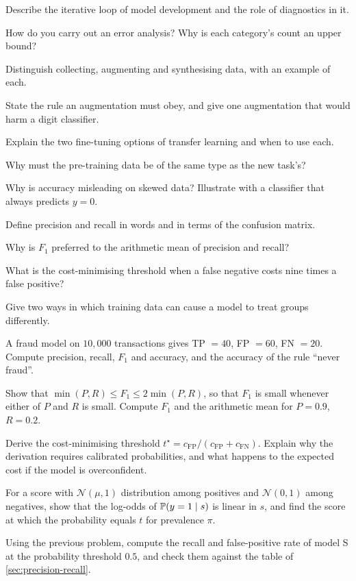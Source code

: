 
\sq Describe the iterative loop of model development and the role of
diagnostics in it.

\sq How do you carry out an error analysis? Why is each category's count an
upper bound?

\sq Distinguish collecting, augmenting and synthesising data, with an example of
each.

\sq State the rule an augmentation must obey, and give one augmentation that
would harm a digit classifier.

\sq Explain the two fine-tuning options of transfer learning and when to use
each.

\sq Why must the pre-training data be of the same type as the new task's?

\sq Why is accuracy misleading on skewed data? Illustrate with a classifier that
always predicts $y = 0$.

\sq Define precision and recall in words and in terms of the confusion matrix.

\sq Why is $F_1$ preferred to the arithmetic mean of precision and recall?

\sq What is the cost-minimising threshold when a false negative costs nine times
a false positive?

\sq Give two ways in which training data can cause a model to treat groups
differently.


\ap A fraud model on $10{,}000$ transactions gives TP $= 40$, FP $= 60$,
FN $= 20$. Compute precision, recall, $F_1$ and accuracy, and the accuracy of
the rule ``never fraud''.

\ap Show that $\min(P,R) \le F_1 \le 2\min(P,R)$, so that $F_1$ is small
whenever either of $P$ and $R$ is small. Compute $F_1$ and the arithmetic mean
for $P = 0.9$, $R = 0.2$.

\ap Derive the cost-minimising threshold $t^\star = c_{\text{FP}}/(c_{\text{FP}} +
c_{\text{FN}})$. Explain why the derivation requires calibrated probabilities,
and what happens to the expected cost if the model is overconfident.

\ap For a score with $\mathcal{N}(\mu, 1)$ distribution among positives and
$\mathcal{N}(0,1)$ among negatives, show that the log-odds of $\mathbb{P}(y=1\mid s)$
is linear in $s$, and find the score at which the probability equals $t$ for
prevalence $\pi$.

\ap Using the previous problem, compute the recall and false-positive rate of
model S at the probability threshold $0.5$, and check them against the table of
\cref{sec:precision-recall}.


